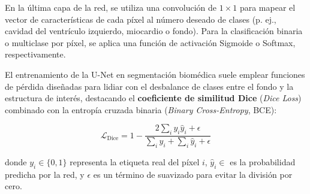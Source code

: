 En la última capa de la red, se utiliza una convolución de $1 \times 1$ para mapear el vector de características de cada píxel al número deseado de clases (p. ej., cavidad del ventrículo izquierdo, miocardio o fondo). Para la clasificación binaria o multiclase por píxel, se aplica una función de activación Sigmoide o Softmax, respectivamente.

El entrenamiento de la U-Net en segmentación biomédica suele emplear funciones de pérdida diseñadas para lidiar con el desbalance de clases entre el fondo y la estructura de interés, destacando el \textbf{coeficiente de similitud Dice} (\textit{Dice Loss}) combinado con la entropía cruzada binaria (\textit{Binary Cross-Entropy}, BCE):

\begin{equation}
    \mathcal{L}_{\text{Dice}} = 1 - \frac{2 \sum_{i} y_i \hat{y}_i + \epsilon}{\sum_{i} y_i + \sum_{i} \hat{y}_i + \epsilon}
\end{equation}

donde $y_i \in \{0,1\}$ representa la etiqueta real del píxel $i$, $\hat{y}_i \in$ es la probabilidad predicha por la red, y $\epsilon$ es un término de suavizado para evitar la división por cero.













